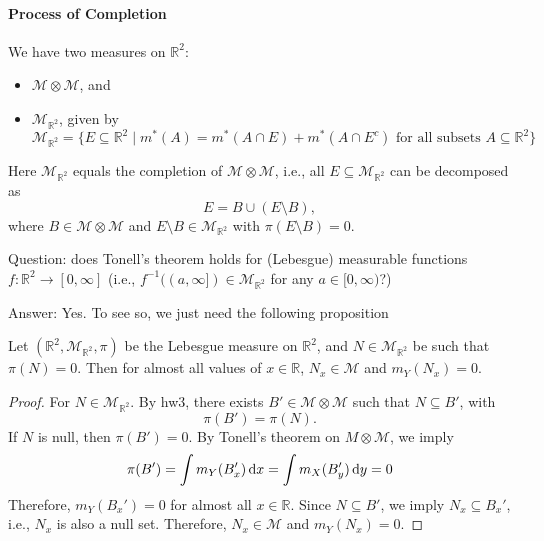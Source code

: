 \paragraph{Process of Completion}
We have two measures on $\mathbb{R}^2$:
\begin{itemize}
\item
$\mathcal{M}\otimes\mathcal{M}$, and
\item
$\mathcal{M}_{\mathbb{R}^2}$, given by
\[
\mathcal{M}_{\mathbb{R}^2} = 
\{E\subseteq\mathbb{R}^2\mid m^*(A)=m^*(A\cap E)+m^*(A\cap E^c)\text{ for all subsets $A\subseteq\mathbb{R}^2$}\}
\]
\end{itemize}
Here $\mathcal{M}_{\mathbb{R}^2}$ equals the completion of $\mathcal{M}\otimes\mathcal{M}$, i.e.,
all $E\subseteq\mathcal{M}_{\mathbb{R}^2}$ can be decomposed as
\[
E = B\cup(E\setminus B),
\]
where $B\in\mathcal{M}\otimes\mathcal{M}$ and $E\setminus B\in \mathcal{M}_{\mathbb{R}^2}$ with $\pi(E\setminus B)=0$.

Question: does Tonell's theorem holds for (Lebesgue) measurable functions $f:\mathbb{R}^2\to[0,\infty]$ (i.e., $f^{-1}((a,\infty])\in \mathcal{M}_{\mathbb{R}^2}$ for any $a\in[0,\infty)$?)

Answer: Yes.
To see so, we just need the following proposition
\begin{proposition}
Let $(\mathbb{R}^2,\mathcal{M}_{\mathbb{R}^2},\pi)$ be the Lebesgue measure on $\mathbb{R}^2$, and $N\in\mathcal{M}_{\mathbb{R}^2}$ be such that $\pi(N)=0$.
Then for almost all values of $x\in\mathbb{R}$, $N_x\in\mathcal{M}$ and $m_Y(N_x)=0$.
\end{proposition}
\begin{proof}
For $N\in\mathcal{M}_{\mathbb{R}^2}$. By hw3, there exists $B'\in\mathcal{M}\otimes\mathcal{M}$ such that $N\subseteq B'$, with
\[
\pi(B')=\pi(N).
\]
If $N$ is null, then $\pi(B')=0$. By Tonell's theorem on $M\otimes\mathcal{M}$, we imply
\[
\pi(B') =\int m_Y(B_x')\,\mathrm{d} x = \int m_X(B_y')\,\mathrm{d} y=0
\]
Therefore, $m_Y(B_x')=0$ for almost all $x\in\mathbb{R}$.
Since $N\subseteq B'$, we imply $N_x\subseteq B_x'$, i.e., $N_x$ is also a null set.
Therefore, $N_x\in\mathcal{M}$ and $m_Y(N_x)=0$.
\end{proof}

